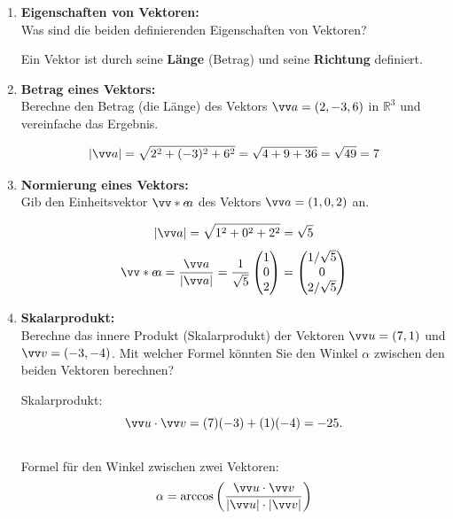\documentclass[11pt, a4paper]{article}
\begin{document}
\begin{enumerate}[label=\textbf{\arabic*.},itemsep=0.50cm]
    \item \textbf{Eigenschaften von Vektoren:} \\
    Was sind die beiden definierenden Eigenschaften von Vektoren?
    \begin{solutionbox}
        Ein Vektor ist durch seine \textbf{Länge} (Betrag) und seine \textbf{Richtung} definiert.
    \end{solutionbox}
    
    \item \textbf{Betrag eines Vektors:} \\
    Berechne den Betrag (die Länge) des Vektors $\ivec{a} = (2, -3, 6)$ in $\mathbb{R}^3$ und vereinfache das Ergebnis.
    \begin{solutionbox}
        \[ |\ivec{a}| = \sqrt{2^2 + (-3)^2 + 6^2} = \sqrt{4 + 9 + 36} = \sqrt{49} = 7 \]
    \end{solutionbox}
    
    \item \textbf{Normierung eines Vektors:} \\
    Gib den Einheitsvektor $\ivecS{e}{a}$ des Vektors $\ivec{a} = (1, 0, 2)$ an.
    \begin{solutionbox}
        \[ |\ivec{a}| = \sqrt{1^2 + 0^2 + 2^2} = \sqrt{5} \]
        \[ \ivecS{e}{a} = \frac{\ivec{a}}{|\ivec{a}|} = \frac{1}{\sqrt{5}} \begin{pmatrix} 1 \\ 0 \\ 2 \end{pmatrix} = \begin{pmatrix} 1/\sqrt{5} \\ 0 \\ 2/\sqrt{5} \end{pmatrix} \]
    \end{solutionbox}
    
    \item \textbf{Skalarprodukt:} \\
    Berechne das innere Produkt (Skalarprodukt) der Vektoren $\ivec{u} = (7, 1)$ und $\ivec{v} = (-3, -4)$.
    Mit welcher Formel könnten Sie den Winkel $\alpha$ zwischen den beiden Vektoren berechnen?
    \begin{solutionbox}
        Skalarprodukt: \[\ivec{u} \cdot \ivec{v} = (7)(-3) + (1)(-4) = -25 .\] \\[0.1cm]
        Formel für den Winkel zwischen zwei Vektoren:
        \[ \alpha = \arccos\left(\frac{\ivec{u} \cdot \ivec{v}}{|\ivec{u}| \cdot |\ivec{v}|}\right) \]
    \end{solutionbox}
    

\end{enumerate}
\end{document}
